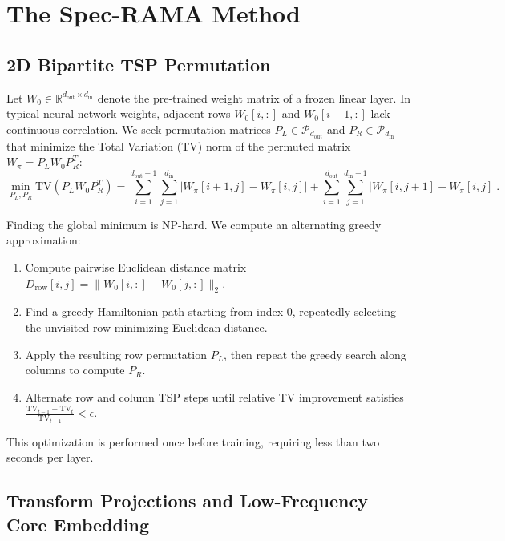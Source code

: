 \documentclass{article}
\begin{document}
\section{The Spec-RAMA Method}

\subsection{2D Bipartite TSP Permutation}

Let $W_0 \in \mathbb{R}^{d_{\text{out}} \times d_{\text{in}}}$ denote the pre-trained weight matrix of a frozen linear layer. In typical neural network weights, adjacent rows $W_0[i, :]$ and $W_0[i+1, :]$ lack continuous correlation. We seek permutation matrices $P_L \in \mathcal{P}_{d_{\text{out}}}$ and $P_R \in \mathcal{P}_{d_{\text{in}}}$ that minimize the Total Variation (TV) norm of the permuted matrix $W_\pi = P_L W_0 P_R^T$:
\begin{equation}
\min_{P_L, P_R} \text{TV}(P_L W_0 P_R^T) = \sum_{i=1}^{d_{\text{out}}-1} \sum_{j=1}^{d_{\text{in}}} |W_\pi[i+1, j] - W_\pi[i, j]| + \sum_{i=1}^{d_{\text{out}}} \sum_{j=1}^{d_{\text{in}}-1} |W_\pi[i, j+1] - W_\pi[i, j]|.
\end{equation}

Finding the global minimum is NP-hard. We compute an alternating greedy approximation:
\begin{enumerate}
    \item Compute pairwise Euclidean distance matrix $D_{\text{row}}[i, j] = \|W_0[i, :] - W_0[j, :]\|_2$.
    \item Find a greedy Hamiltonian path starting from index $0$, repeatedly selecting the unvisited row minimizing Euclidean distance.
    \item Apply the resulting row permutation $P_L$, then repeat the greedy search along columns to compute $P_R$.
    \item Alternate row and column TSP steps until relative TV improvement satisfies $\frac{\text{TV}_{t-1} - \text{TV}_t}{\text{TV}_{t-1}} < \epsilon$.
\end{enumerate}
This optimization is performed once before training, requiring less than two seconds per layer.

\subsection{Transform Projections and Low-Frequency Core Embedding}
\end{document}
